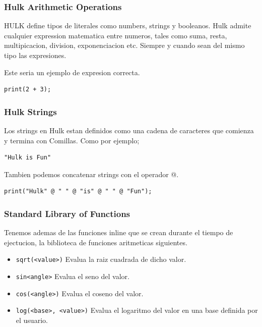 \documentclass[a4paper, 12pt]{report}
\begin{document}
\subsubsection*{Hulk Arithmetic Operations}

HULK define tipos de literales como numbers, strings y booleanos. Hulk admite cualquier expression matematica entre numeros, tales como suma, resta, multipicacion, division, exponenciacion etc. Siempre y cuando sean del mismo tipo las expresiones.

Este seria un ejemplo de expresion correcta.

\begin{lstlisting}
print(2 + 3);
\end{lstlisting}

\subsubsection*{Hulk Strings}

Los strings en Hulk estan definidos como una cadena de caracteres que comienza y termina con Comillas.
Como por ejemplo;
\begin{lstlisting}
"Hulk is Fun"
\end{lstlisting}

Tambien podemos concatenar strings con el operador @.

\begin{lstlisting}
print("Hulk" @ " " @ "is" @ " " @ "Fun");
\end{lstlisting}

\subsubsection*{Standard Library of Functions}

Tenemos ademas de las funciones inline que se crean durante el tiempo de ejectucion, la biblioteca de funciones aritmeticas siguientes.

\begin{itemize}
  \item {\tt sqrt(<value>)} Evalua la raiz cuadrada de dicho valor.
  \item {\tt sin{<angle>}}  Evalua el seno del valor.
  \item {\tt cos(<angle>)} Evalua el coseno del valor.
  \item {\tt log(<base>, <value>)} Evalua el logaritmo del valor en una base definida por el usuario.
\end{itemize}
\end{document}
